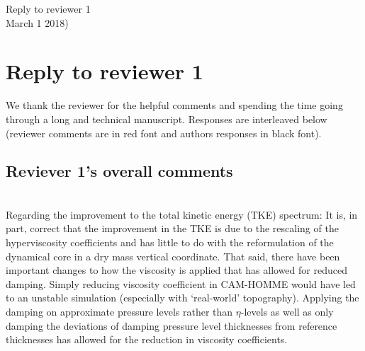 \documentclass[11pt]{article}
\begin{document}
\begin{center}
 {\large   \sf Reply to reviewer 1}\\
    \vspace{.1in}
    March 1 2018)
  \end{center}
\section{Reply to reviewer 1}
We thank the reviewer for the helpful comments and spending the time going through a long and technical manuscript. Responses are interleaved below (reviewer comments are in red font and authors responses in black font). 
\subsection{Reviever 1's overall comments}
{\color{red}{
This is a well-written and mostly comprehensive paper describing a new dynamical core, and should be published to document the advances described within and the dynamical core characteristics.}}

{\color{red}{
 I do feel that some of the major changes compared with the earlier CAM-HOMME are not well-justified, while some of the improvements demonstrated (especially with regard to the kinetic energy spectrum) are a re-configuration of the model and not intrinsic to the core formulation.}}\\

Regarding the improvement to the total kinetic energy (TKE) spectrum: It is, in part, correct that the improvement in the TKE is due to the rescaling of the hyperviscosity coefficients and has little to do with the reformulation of the dynamical core in a dry mass vertical coordinate. That said, there have been important changes to how the viscosity is applied that has allowed for reduced damping. Simply reducing viscosity coefficient in CAM-HOMME would have led to an unstable simulation (especially with `real-world' topography). Applying the damping on approximate pressure levels rather than $\eta$-levels as well as only damping the deviations of damping pressure level thicknesses from reference thicknesses has allowed for the reduction in viscosity coefficients.\\
\end{document}
